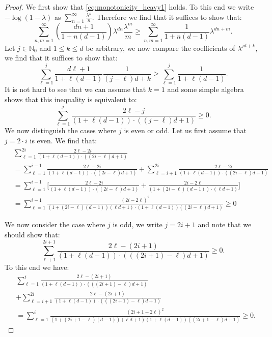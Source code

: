 \documentclass[12pt]{report}
\begin{document}
\begin{proof}
We first show that \eqref{eq:monotonicity_heavy1} holds. To this end we write $-\log(1-\lambda)$ as $\sum_{n=1}^\infty \frac{\lambda^{n}}{n}$. Therefore we find that it suffices to show that:
	$$
	\sum_{n,m=1}^\infty \left( \frac{dn+1}{1+n(d-1)} \right) \lambda^{dn} \frac{\lambda^m}{m} \geq \sum_{n,m=1}^\infty \frac{1}{1+n(d-1)} \lambda^{dn+m}.
	$$
	Let $j \in \mathbb{N}_0$ and $1 \leq k \leq d$ be arbitrary, we now compare the coefficients of $\lambda^{jd+k}$, we find that it suffices to show that:
	$$
	\sum_{\ell=1}^j \frac{d\ell+1}{1+\ell(d-1)} \frac{1}{(j-\ell)d + k} \geq \sum_{\ell=1}^j \frac{1}{1+\ell(d-1)}.
	$$
	It is not hard to see that we can assume that $k=1$ and some simple algebra shows that this inequality is equivalent to:$$
	\sum_{\ell=1}^j \frac{2\ell-j}{(1+\ell(d-1))\cdot((j-\ell)d+1)} \geq 0.
	$$
	We now distinguish the cases where $j$ is even or odd. Let us first assume that $j=2\cdot i $ is even. We find that:
	\begin{align*}
		&\sum_{\ell=1}^{2i} \frac{2\ell - 2i}{(1+\ell(d-1))\cdot ((2i-\ell)d+1)}\\
		&= \sum_{\ell=1}^{i-1} \frac{2\ell - 2i}{(1+\ell(d-1))\cdot ((2i-\ell)d+1)}
		+ \sum_{\ell=i+1}^{2i} \frac{2\ell - 2i}{(1+\ell(d-1))\cdot ((2i-\ell)d+1)}\\
		&= \sum_{\ell=1}^{i-1} \bigg[\frac{2\ell - 2i}{(1+\ell(d-1))\cdot ((2i-\ell)d+1)}
		+ \frac{2i - 2\ell}{(1+(2i-\ell)(d-1))\cdot(\ell d + 1)} \bigg]\\
		&= \sum_{\ell=1}^{i-1} \frac{(2i-2\ell)^2}{(1+(2i-\ell)(d-1))(\ell d+1) \cdot (1 + \ell(d-1))((2i - \ell)d + 1)} \geq 0
	\end{align*}
	
	We now consider the case where $j$ is odd, we write $j= 2i + 1$ and note that we should show that:
	$$
	\sum_{\ell+1}^{2i+1} \frac{2 \ell - (2i +1)}{(1+\ell(d-1)) \cdot (((2i + 1) - \ell) d + 1)} \geq 0.
	$$
	To this end we have:
	\begin{align*}
		&\sum_{\ell=1}^i \frac{2 \ell - (2i +1)}{(1+\ell(d-1)) \cdot (((2i + 1) - \ell) d + 1)}\\
		&+ \sum_{\ell = i+1}^{2i} \frac{2 \ell - (2i +1)}{(1+\ell(d-1)) \cdot (((2i + 1) - \ell) d + 1)}\\
		&= \sum_{\ell=1}^i \frac{(2i+1-2\ell)^2}{(1+(2i+1-\ell)(d-1))(\ell d + 1) (1 + \ell (d-1)) ((2i + 1 - \ell) d + 1)} \geq 0.
	\end{align*}
	

\end{proof}
\end{document}
